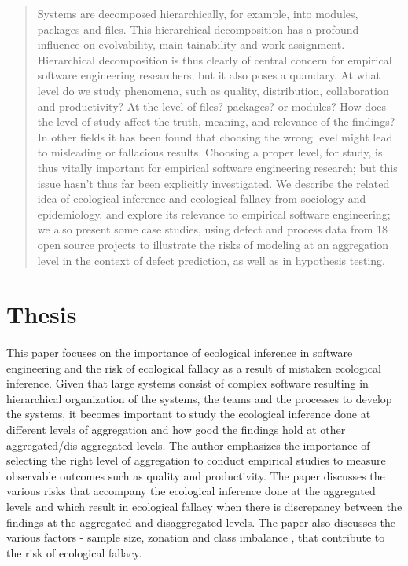 \documentclass[12pt]{article}
\begin{document}
\maketitle

\begin{abstract}
Systems are decomposed hierarchically, for example, into modules, packages and files. This hierarchical decomposition has a profound influence on evolvability, main-tainability and work assignment. Hierarchical decomposition is
thus clearly of central concern for empirical software engineering researchers; but it also poses a quandary. At what level do we study phenomena, such as quality, distribution, collaboration and
productivity? At the level of files? packages? or modules? How does the level of study affect the truth, meaning, and relevance of the findings? In other fields it has been found that choosing
the wrong level might lead to misleading or fallacious results. Choosing a proper level, for study, is thus vitally important for empirical software engineering research; but this issue hasn’t
thus far been explicitly investigated. We describe the related idea of ecological inference and ecological fallacy from sociology and epidemiology, and explore its relevance to empirical software
engineering; we also present some case studies, using defect and process data from 18 open source projects to illustrate the risks of modeling at an aggregation level in the context of defect
prediction, as well as in hypothesis testing.
\end{abstract}

\section{Thesis}\label{thesis}
\paragraph{}This paper focuses on the importance of ecological inference in software engineering and the risk of ecological fallacy as a result of mistaken ecological inference. Given that large systems consist of complex software
resulting in hierarchical organization of the systems, the teams and the processes to develop the systems, it becomes important to study the ecological inference
done at different levels of aggregation and how good the findings hold at other aggregated/dis-aggregated levels. The author emphasizes the importance of selecting the 
right level of aggregation to conduct empirical studies to measure observable outcomes such as quality and productivity. The paper discusses the various risks that accompany the 
ecological inference done at the aggregated levels and which result in ecological fallacy when there is discrepancy between the findings at the aggregated and disaggregated levels. The
paper also discusses the various factors - sample size, zonation and class imbalance , that contribute to the risk of ecological fallacy.
\end{document}
